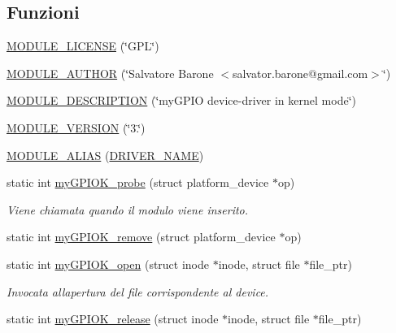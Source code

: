 \subsection*{Funzioni}
\begin{DoxyCompactItemize}
\item 
\hyperlink{group___linux-_driver_gad94b36675e7eb067ea3ce6ff9e244a44}{M\+O\+D\+U\+L\+E\+\_\+\+L\+I\+C\+E\+N\+SE} (\char`\"{}G\+PL\char`\"{})
\item 
\hyperlink{group___linux-_driver_gaa528ef168ff30340d38c46a12fce906b}{M\+O\+D\+U\+L\+E\+\_\+\+A\+U\+T\+H\+OR} (\char`\"{}Salvatore Barone $<$salvator.\+barone@gmail.\+com$>$\char`\"{})
\item 
\hyperlink{group___linux-_driver_ga1a0de0abbfec8f65abc50ccd3a549a4d}{M\+O\+D\+U\+L\+E\+\_\+\+D\+E\+S\+C\+R\+I\+P\+T\+I\+ON} (\char`\"{}my\+G\+P\+IO device-\/driver in kernel mode\char`\"{})
\item 
\hyperlink{group___linux-_driver_ga4d0a47b4ff404d7ced2610438ec9802e}{M\+O\+D\+U\+L\+E\+\_\+\+V\+E\+R\+S\+I\+ON} (\char`\"{}3.\char`\"{})
\item 
\hyperlink{group___linux-_driver_ga1681c4acdb2692baf523dbf58f940399}{M\+O\+D\+U\+L\+E\+\_\+\+A\+L\+I\+AS} (\hyperlink{group___linux-_driver_ga25634d21648ca7fb7a2aca614bafaaeb}{D\+R\+I\+V\+E\+R\+\_\+\+N\+A\+ME})
\item 
static int \hyperlink{group___linux-_driver_gae40973a06d72f7c41a9af07513a62307}{my\+G\+P\+I\+O\+K\+\_\+probe} (struct platform\+\_\+device $\ast$op)
\begin{DoxyCompactList}\small\item\em Viene chiamata quando il modulo viene inserito. \end{DoxyCompactList}\item 
static int \hyperlink{group___linux-_driver_ga59fddfaa36dea357f4bbdfceb0f47f8c}{my\+G\+P\+I\+O\+K\+\_\+remove} (struct platform\+\_\+device $\ast$op)
\item 
static int \hyperlink{group___linux-_driver_gad013759c18fbf6ea96005b9b3bfa5b4e}{my\+G\+P\+I\+O\+K\+\_\+open} (struct inode $\ast$inode, struct file $\ast$file\+\_\+ptr)
\begin{DoxyCompactList}\small\item\em Invocata all\textquotesingle{}apertura del file corrispondente al device. \end{DoxyCompactList}\item 
static int \hyperlink{group___linux-_driver_ga17ce7f574723246c790b70b06e3e7103}{my\+G\+P\+I\+O\+K\+\_\+release} (struct inode $\ast$inode, struct file $\ast$file\+\_\+ptr)

\end{DoxyCompactItemize}
